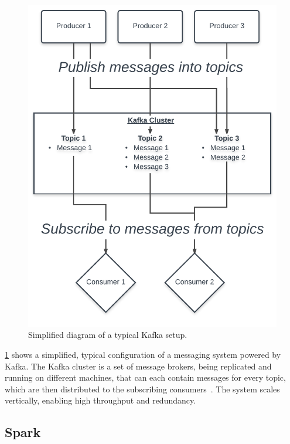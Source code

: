 \begin{figure}
    \centering
    \caption{Simplified diagram of a typical Kafka setup.}
    \label{fig:kafka}
    \includegraphics[width=\textwidth]{../figures/kafka.pdf}
\end{figure}

\ref{fig:kafka} shows a simplified, typical configuration of a messaging system powered by Kafka.
The Kafka cluster is a set of message brokers, being replicated and running on different machines, that can each contain messages for every topic,
which are then distributed to the subscribing consumers~\cite{Kreps2015}.
The system scales vertically, enabling high throughput and redundancy.

\subsection{Spark}
\label{subsec:spark}

